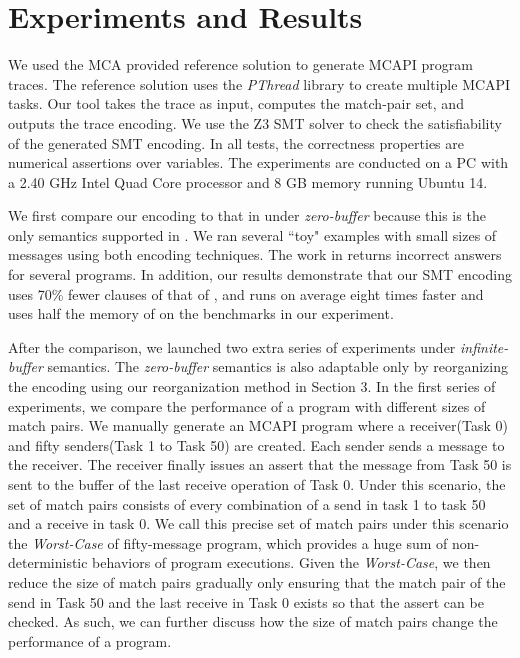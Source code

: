 \section{Experiments and Results}
We used the MCA provided reference solution to generate MCAPI program traces. The reference solution uses the \textit{PThread} library to create multiple MCAPI tasks. Our tool takes the trace as input, computes the match-pair set, and outputs the trace encoding. We use the Z3 SMT solver \cite{demoura:tacas08} to check the satisfiability of the generated SMT encoding. In all tests, the correctness properties are numerical assertions over variables. The experiments are conducted on a PC with a 2.40 GHz Intel Quad Core processor and 8 GB memory running Ubuntu 14.

We first compare our encoding to that in \cite{elwakil:padtad10} under \textit{zero-buffer} because this is the only semantics supported in \cite{elwakil:padtad10}. We ran several ``toy" examples with small sizes of messages using both encoding techniques. The work in \cite{elwakil:padtad10} returns incorrect answers for several programs. In addition, our results demonstrate that our SMT encoding uses 70\% fewer clauses of that of \cite{elwakil:padtad10}, and runs on average eight times faster and uses half the memory of \cite{elwakil:padtad10} on the benchmarks in our experiment.

After the comparison, we launched two extra series of experiments under \textit{infinite-buffer} semantics. The \textit{zero-buffer} semantics is also adaptable only by reorganizing the encoding using our reorganization method in Section 3. In the first series of experiments, we compare the performance of a program with different sizes of match pairs. We manually generate an MCAPI program where a receiver(Task 0) and fifty senders(Task 1 to Task 50) are created. Each sender sends a message to the receiver. The receiver finally issues an assert that the message from Task 50 is sent to the buffer of the last receive operation of Task 0. Under this scenario, the set of match pairs consists of every combination of a send in task 1 to task 50 and a receive in task 0. We call this precise set of match pairs under this scenario the \textit{Worst-Case} of fifty-message program, which provides a huge sum of non-deterministic behaviors of program executions. Given the \textit{Worst-Case}, we then reduce the size of match pairs gradually only ensuring that the match pair of the send in Task 50 and the last receive in Task 0 exists so that the assert can be checked. As such, we can further discuss how the size of match pairs change the performance of a program.


